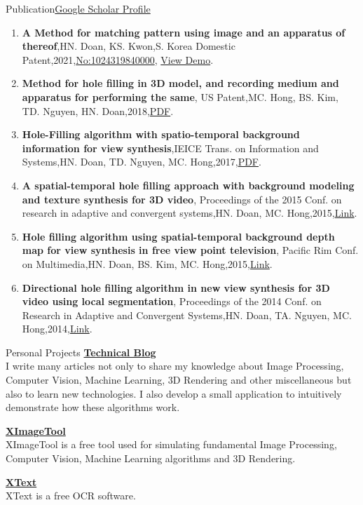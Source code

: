 \documentclass{resume}
\begin{document}
	\begin{rSection}{Publication}\href{https://scholar.google.co.kr/citations?user=nhm8WBMAAAAJ&hl=en}{Google Scholar Profile}
	\begin{enumerate}[leftmargin=*]
		\item {\bf A Method for matching pattern using image and an apparatus of thereof},{HN. Doan, KS. Kwon},{S. Korea Domestic Patent},{2021},{\href{https://doi.org/10.8080/1020210025073}{No:1024319840000}}, \href{https://blog.naver.com/mvtech_ravid/222119961697}{View Demo}.
		\item {\bf Method for hole filling in 3D model, and recording medium and apparatus for performing the same},{ US Patent},{MC. Hong, BS. Kim, TD. Nguyen, HN. Doan},{2018},\href{https://patentimages.storage.googleapis.com/d5/ab/0a/111cb20d160a96/US9916694.pdf}{PDF}.
		\item {\bf Hole-Filling algorithm with spatio-temporal background information for view synthesis},{IEICE Trans. on Information and Systems},{HN. Doan, TD. Nguyen, MC. Hong},{2017},\href{https://www.jstage.jst.go.jp/article/transinf/E100.D/9/E100.D_2016PCP0010/_pdf}{PDF}.
		\item {\bf A spatial-temporal hole filling approach with background modeling and texture synthesis for 3D video},{ Proceedings of the 2015 Conf.  on research in adaptive and convergent systems},{HN. Doan, MC. Hong},{2015},\href{https://dl.acm.org/doi/abs/10.1145/2811411.2811497}{Link}.
		\item {\bf Hole filling algorithm using spatial-temporal background depth map for view synthesis in free view point television},{ Pacific Rim Conf.  on Multimedia},{HN. Doan, BS. Kim, MC. Hong},{2015},\href{https://link.springer.com/chapter/10.1007/978-3-319-24078-7_61}{Link}.
 		\item {\bf Directional hole filling algorithm in new view synthesis for 3D video using local segmentation},{ Proceedings of the 2014 Conf.  on Research in Adaptive and Convergent Systems},{HN. Doan, TA. Nguyen, MC. Hong},{2014},\href{https://dl.acm.org/doi/abs/10.1145/2663761.2664229}{Link}.
	\end{enumerate}	
	\end{rSection}

	\begin{rSection}{Personal Projects}
		{\bf \href{https://noidh.github.io/blog.html}{Technical Blog}}
		\\ I write many articles not only to share my knowledge about Image Processing, Computer Vision, Machine Learning, 3D Rendering and other miscellaneous but also to learn new technologies.  I also develop a small application to intuitively demonstrate how these algorithms work.

		{\bf  \href{https://noidh.github.io/pages/sw/ximagetool/ximagetool.html}{XImageTool}}
		\\ XImageTool is a free tool used for simulating fundamental Image Processing, Computer Vision, Machine Learning algorithms and 3D Rendering.

		{\bf \href{https://noidh.github.io/pages/sw/ximage2text/ximagetotext.html}{XText}}
		\\ XText is a free OCR software.
	\end{rSection}
\end{document}
